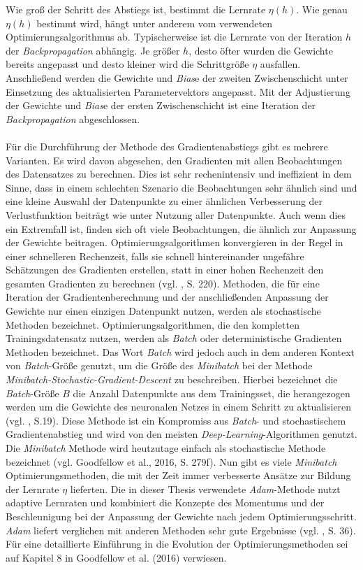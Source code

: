 \documentclass[a4paper,11pt]{article}
\begin{document}
Wie groß der Schritt des Abstiegs ist, bestimmt die Lernrate $\eta(h)$.
Wie genau $\eta(h)$ bestimmt wird, hängt unter anderem vom verwendeten Optimierungsalgorithmus ab. Typischerweise ist die Lernrate von der Iteration $h$ der \textit{Backpropagation} abhängig. Je größer $h$, desto öfter wurden die Gewichte bereits angepasst und desto kleiner wird die Schrittgröße $\eta$ ausfallen. 
Anschließend werden die Gewichte und \textit{Bias}e der zweiten Zwischenschicht unter Einsetzung des aktualisierten Parametervektors angepasst. Mit der Adjustierung der Gewichte und \textit{Bias}e der ersten Zwischenschicht ist eine Iteration der \textit{Backpropagation} abgeschlossen.\\
\\
Für die Durchführung der Methode des Gradientenabstiegs gibt es mehrere Varianten. Es wird davon abgesehen, den Gradienten mit allen Beobachtungen des Datensatzes zu berechnen. Dies ist sehr rechenintensiv und ineffizient in dem Sinne, dass in einem schlechten Szenario die Beobachtungen sehr ähnlich sind und eine kleine Auswahl der Datenpunkte zu einer ähnlichen Verbesserung der Verlustfunktion beiträgt wie unter Nutzung aller Datenpunkte. Auch wenn dies ein Extremfall ist, finden sich oft viele Beobachtungen, die ähnlich zur Anpassung der Gewichte beitragen. Optimierungsalgorithmen konvergieren in der Regel in einer schnelleren Rechenzeit, falls sie schnell hintereinander ungefähre Schätzungen des Gradienten erstellen, statt in einer hohen Rechenzeit den gesamten Gradienten zu berechnen (vgl. \cite{deepEssentials}, S. 220). Methoden, die für eine Iteration der Gradientenberechnung und der anschließenden Anpassung der Gewichte nur einen einzigen Datenpunkt nutzen, werden als stochastische Methoden bezeichnet. Optimierungsalgorithmen, die den kompletten Trainingsdatensatz nutzen, werden als \textit{Batch} oder deterministische Gradienten Methoden bezeichnet. Das Wort \textit{Batch} wird jedoch auch in dem anderen Kontext von \textit{Batch}-Größe genutzt, um die Größe des \textit{Minibatch} bei der Methode \textit{Minibatch-Stochastic-Gradient-Descent} zu beschreiben. Hierbei bezeichnet die \textit{Batch}-Größe $B$ die Anzahl Datenpunkte aus dem Trainingsset, die herangezogen werden um die Gewichte des neuronalen Netzes in einem Schritt zu aktualisieren (vgl. \cite{keras}, S.19). Diese Methode ist ein Kompromiss aus \textit{Batch}- und stochastischem Gradientenabstieg und wird von den meisten \textit{Deep-Learning}-Algorithmen genutzt. Die \textit{Minibatch} Methode wird heutzutage einfach als stochastische Methode bezeichnet (vgl. Goodfellow et al., 2016, S. 279f). Nun gibt es viele \textit{Minibatch} Optimierungsmethoden, die mit der Zeit immer verbesserte Ansätze zur Bildung der Lernrate $\eta$ lieferten. Die in dieser Thesis verwendete \textit{Adam}-Methode nutzt adaptive Lernraten und kombiniert die Konzepte des Momentums und der Beschleunigung bei der Anpassung der Gewichte nach jedem Optimierungsschritt. \textit{Adam} liefert verglichen mit anderen Methoden sehr gute Ergebnisse (vgl. \cite{keras}, S. 36). Für eine detaillierte Einführung in die Evolution der Optimierungsmethoden sei auf Kapitel 8 in Goodfellow et al. (2016) verwiesen. \\
\end{document}
